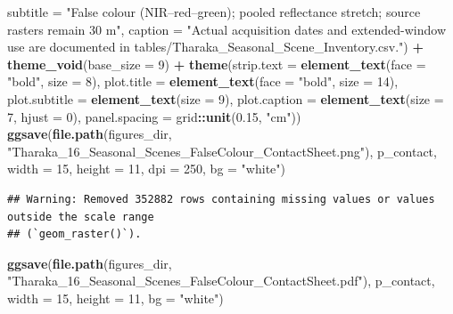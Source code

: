 \documentclass[
]{article}
\newenvironment{Shaded}{\begin{snugshade}}{\end{snugshade}}
\newcommand{\AttributeTok}[1]{\textcolor[rgb]{0.13,0.29,0.53}{#1}}
\newcommand{\DecValTok}[1]{\textcolor[rgb]{0.00,0.00,0.81}{#1}}
\newcommand{\FloatTok}[1]{\textcolor[rgb]{0.00,0.00,0.81}{#1}}
\newcommand{\FunctionTok}[1]{\textcolor[rgb]{0.13,0.29,0.53}{\textbf{#1}}}
\newcommand{\NormalTok}[1]{#1}
\newcommand{\SpecialCharTok}[1]{\textcolor[rgb]{0.81,0.36,0.00}{\textbf{#1}}}
\newcommand{\StringTok}[1]{\textcolor[rgb]{0.31,0.60,0.02}{#1}}
\begin{document}
\begin{Shaded}
\begin{Highlighting}[]
       \AttributeTok{subtitle =} \StringTok{"False colour (NIR–red–green); pooled reflectance stretch; source rasters remain 30 m"}\NormalTok{,}
       \AttributeTok{caption =} \StringTok{"Actual acquisition dates and extended{-}window use are documented in tables/Tharaka\_Seasonal\_Scene\_Inventory.csv."}\NormalTok{) }\SpecialCharTok{+}
  \FunctionTok{theme\_void}\NormalTok{(}\AttributeTok{base\_size =} \DecValTok{9}\NormalTok{) }\SpecialCharTok{+}
  \FunctionTok{theme}\NormalTok{(}\AttributeTok{strip.text =} \FunctionTok{element\_text}\NormalTok{(}\AttributeTok{face =} \StringTok{"bold"}\NormalTok{, }\AttributeTok{size =} \DecValTok{8}\NormalTok{),}
        \AttributeTok{plot.title =} \FunctionTok{element\_text}\NormalTok{(}\AttributeTok{face =} \StringTok{"bold"}\NormalTok{, }\AttributeTok{size =} \DecValTok{14}\NormalTok{),}
        \AttributeTok{plot.subtitle =} \FunctionTok{element\_text}\NormalTok{(}\AttributeTok{size =} \DecValTok{9}\NormalTok{),}
        \AttributeTok{plot.caption =} \FunctionTok{element\_text}\NormalTok{(}\AttributeTok{size =} \DecValTok{7}\NormalTok{, }\AttributeTok{hjust =} \DecValTok{0}\NormalTok{),}
        \AttributeTok{panel.spacing =}\NormalTok{ grid}\SpecialCharTok{::}\FunctionTok{unit}\NormalTok{(}\FloatTok{0.15}\NormalTok{, }\StringTok{"cm"}\NormalTok{))}
\FunctionTok{ggsave}\NormalTok{(}\FunctionTok{file.path}\NormalTok{(figures\_dir, }\StringTok{"Tharaka\_16\_Seasonal\_Scenes\_FalseColour\_ContactSheet.png"}\NormalTok{), p\_contact, }\AttributeTok{width =} \DecValTok{15}\NormalTok{, }\AttributeTok{height =} \DecValTok{11}\NormalTok{, }\AttributeTok{dpi =} \DecValTok{250}\NormalTok{, }\AttributeTok{bg =} \StringTok{"white"}\NormalTok{)}
\end{Highlighting}
\end{Shaded}

\begin{verbatim}
## Warning: Removed 352882 rows containing missing values or values outside the scale range
## (`geom_raster()`).
\end{verbatim}

\begin{Shaded}
\begin{Highlighting}[]
\FunctionTok{ggsave}\NormalTok{(}\FunctionTok{file.path}\NormalTok{(figures\_dir, }\StringTok{"Tharaka\_16\_Seasonal\_Scenes\_FalseColour\_ContactSheet.pdf"}\NormalTok{), p\_contact, }\AttributeTok{width =} \DecValTok{15}\NormalTok{, }\AttributeTok{height =} \DecValTok{11}\NormalTok{, }\AttributeTok{bg =} \StringTok{"white"}\NormalTok{)}
\end{Highlighting}
\end{Shaded}
\end{document}
